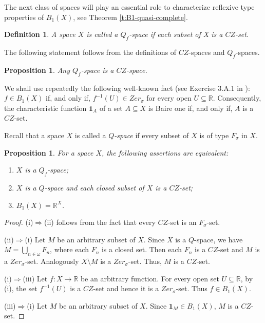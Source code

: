 \documentclass[preprint,11pt]{elsarticle}
\newtheorem{proposition}[theorem]{Proposition}
\newtheorem{definition}[theorem]{Definition}
\numberwithin{equation}{section}
\numberwithin{theorem}{section}
\newcommand{\RR}{\mathbb{R}}
\newcommand{\IR}{\mathbb{R}}
\newcommand{\Ra}{\Rightarrow}
\newcommand{\SM}{{\setminus}}
\def\om{\omega}
\begin{document}
 The next class of spaces will play an essential role to characterize reflexive type properties of $B_1(X)$, see Theorem \ref{t:B1-quasi-complete}.


\begin{definition} \label{def:Qf-space} {\em
A space $X$ is called a {\em $Q_f$-space}  if each subset of X is a $CZ$-set.}
\end{definition}

The following statement follows from the definitions  of $CZ$-spaces and $Q_f$-spaces.

\begin{proposition}\label{p:Qf-CZ}
Any $Q_f$-space is a $CZ$-space.
\end{proposition}

We shall use repeatedly the following well-known fact (see Exercise 3.A.1 in \protect\cite{lmz1}):  $f\in B_1(X)$ if, and only if, $f^{-1}(U)\in Zer_{\sigma}$ for every open $U\subseteq \IR$. Consequently,  the characteristic function $\mathbf{1}_A$ of a set $A\subseteq X$ is Baire one if, and only if, $A$ is a $CZ$-set.

Recall that a space $X$ is called a {\em $Q$-space} if every subset of $X$  is of type $F_\sigma$ in $X$.

\begin{proposition}\label{p:Qf-def}
For a space $X$, the following assertions are equivalent:
\begin{enumerate}
\item[{\rm (i)}] $X$ is a $Q_f$-space;
\item[{\rm (ii)}] $X$ is a $Q$-space and each closed subset of $X$ is a $CZ$-set;
\item[{\rm (iii)}]
$B_1(X)=\RR^X$.
\end{enumerate}
\end{proposition}
\begin{proof}
(i)$\Ra$(ii) follows from the fact that every $CZ$-set is an $F_\sigma$-set.
\smallskip

(ii)$\Ra$(i) Let $M$ be an arbitrary subset of $X$. Since $X$ is a $Q$-space, we have $M=\bigcup_{n\in\om} F_n$, where each $F_n$ is a closed set. Then each $F_n$ is a $CZ$-set
and $M$ is a $Zer_\sigma$-set. Analogously $X\SM M$ is a  $Zer_\sigma$-set. Thus, $M$ is a $CZ$-set.


(i)$\Ra$(iii)
Let $f:X\to\IR$ be an arbitrary function. For every open set $U\subseteq \IR$, by (i), the set $f^{-1}(U)$ is a $CZ$-set and hence it is a $Zer_{\sigma}$-set. Thus $f\in B_1(X)$.
\smallskip

(iii)$\Ra$(i)
Let $M$ be an arbitrary subset of $X$. Since $\mathbf{1}_M\in B_1(X)$, $M$ is  a $CZ$-set.
\end{proof}
\end{document}

